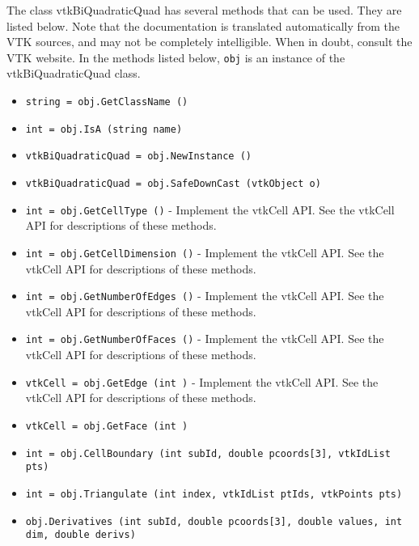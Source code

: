 The class vtkBiQuadraticQuad has several methods that can be used.
  They are listed below.
Note that the documentation is translated automatically from the VTK sources,
and may not be completely intelligible.  When in doubt, consult the VTK website.
In the methods listed below, \verb|obj| is an instance of the vtkBiQuadraticQuad class.
\begin{itemize}
\item  \verb|string = obj.GetClassName ()|

\item  \verb|int = obj.IsA (string name)|

\item  \verb|vtkBiQuadraticQuad = obj.NewInstance ()|

\item  \verb|vtkBiQuadraticQuad = obj.SafeDownCast (vtkObject o)|

\item  \verb|int = obj.GetCellType ()| -  Implement the vtkCell API. See the vtkCell API for descriptions
 of these methods.

\item  \verb|int = obj.GetCellDimension ()| -  Implement the vtkCell API. See the vtkCell API for descriptions
 of these methods.

\item  \verb|int = obj.GetNumberOfEdges ()| -  Implement the vtkCell API. See the vtkCell API for descriptions
 of these methods.

\item  \verb|int = obj.GetNumberOfFaces ()| -  Implement the vtkCell API. See the vtkCell API for descriptions
 of these methods.

\item  \verb|vtkCell = obj.GetEdge (int )| -  Implement the vtkCell API. See the vtkCell API for descriptions
 of these methods.

\item  \verb|vtkCell = obj.GetFace (int )|

\item  \verb|int = obj.CellBoundary (int subId, double pcoords[3], vtkIdList pts)|

\item  \verb|int = obj.Triangulate (int index, vtkIdList ptIds, vtkPoints pts)|

\item  \verb|obj.Derivatives (int subId, double pcoords[3], double values, int dim, double derivs)|


\end{itemize}
